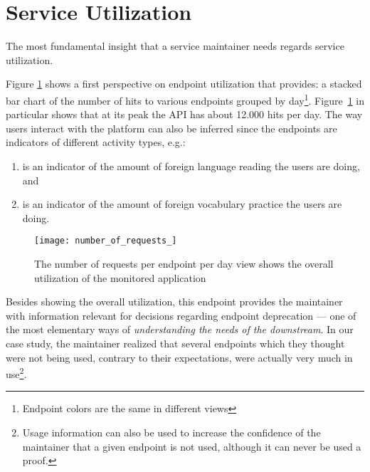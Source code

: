 
\section{Service Utilization}
\label{sec:util}

  The most fundamental insight that a service maintainer needs regards service utilization. %

  Figure \ref{fig:aeu} shows a first perspective on endpoint utilization that \tool provides: a stacked bar chart of the number of hits to various endpoints grouped by day\footnote{Endpoint colors are the same in different views}. Figure~\ref{fig:aeu} in particular shows that at its peak the API has about 12.000 hits per day. 
  The way users interact with the platform can also be inferred since the endpoints are indicators of different activity types, e.g.: 

  \begin{enumerate}

    \item {\color{myred} \epTranslations} is an indicator of the amount of foreign language reading the users are doing, and 

    \item {\color{mygreen} \epOutcome} is an indicator of the amount of foreign vocabulary practice the users are doing.

  \end{enumerate}


  \begin{figure}[!ht]
    \centering
    \texttt{[image: number\_of\_requests\_]}
    \caption{The number of requests per endpoint per day view shows the overall utilization of the monitored application}
    \label{fig:aeu}
  \end{figure}

  Besides showing the overall utilization, this endpoint provides the maintainer with information relevant for decisions regarding endpoint deprecation --- one of the most elementary ways of {\em understanding the needs of the downstream}\cite{Haen14a}. In our case study, the maintainer realized that several endpoints which they thought were not being used, contrary to their expectations, were actually very much in use\footnote{Usage information can also be used to increase the confidence of the maintainer that a given endpoint is not used, although it can never be used a proof.}.

